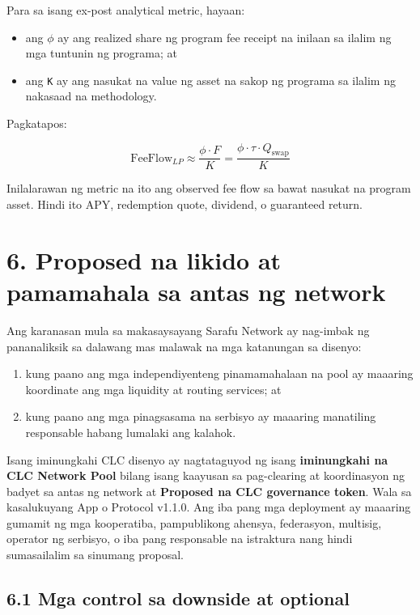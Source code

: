 \documentclass[11pt]{article}
\begin{document}
Para sa isang ex-post analytical metric, hayaan:

\begin{itemize}[leftmargin=*]
\item ang \texttt{$\phi$} ay ang realized share ng program fee receipt na inilaan sa ilalim ng mga tuntunin ng programa; at
\item ang \texttt{K} ay ang nasukat na value ng asset na sakop ng programa sa ilalim ng nakasaad na methodology.
\end{itemize}
Pagkatapos:

\[
\mathrm{FeeFlow}_{LP} \approx \frac{\phi \cdot F}{K} = \frac{\phi \cdot \tau \cdot Q_{\mathrm{swap}}}{K}
\]

Inilalarawan ng metric na ito ang observed fee flow sa bawat nasukat na program asset. Hindi ito APY, redemption quote, dividend, o guaranteed return.


\section*{6. Proposed na likido at pamamahala sa antas ng network}

Ang karanasan mula sa makasaysayang Sarafu Network ay nag-imbak ng pananaliksik sa dalawang mas malawak na mga katanungan sa disenyo:

\begin{enumerate}[leftmargin=*]
\item kung paano ang mga independiyenteng pinamamahalaan na pool ay maaaring koordinate ang mga liquidity at routing services; at
\item kung paano ang mga pinagsasama na serbisyo ay maaaring manatiling responsable habang lumalaki ang kalahok.
\end{enumerate}
Isang iminungkahi CLC disenyo ay nagtataguyod ng isang \textbf{iminungkahi na CLC Network Pool} bilang isang kaayusan sa pag-clearing at koordinasyon ng badyet sa antas ng network at \textbf{Proposed na CLC governance token}. Wala sa kasalukuyang App o Protocol v1.1.0. Ang iba pang mga deployment ay maaaring gumamit ng mga kooperatiba, pampublikong ahensya, federasyon, multisig, operator ng serbisyo, o iba pang responsable na istraktura nang hindi sumasailalim sa sinumang proposal.

\subsection*{6.1 Mga control sa downside at optional}
\end{document}
